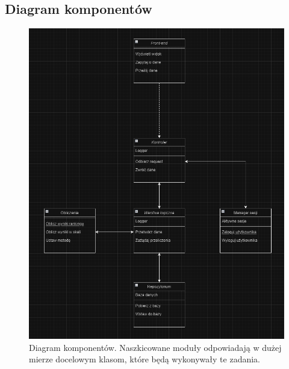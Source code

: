 \documentclass{article}
\begin{document}
\subsection{Diagram komponentów}
\begin{figure}[h!]
    \centering
    \includegraphics[width=\linewidth]{component-diagram.PNG}
    \caption{Diagram komponentów. Naszkicowane moduły odpowiadają w dużej mierze docelowym klasom, które będą wykonywały te zadania.}
\end{figure}

\pagebreak
\end{document}
